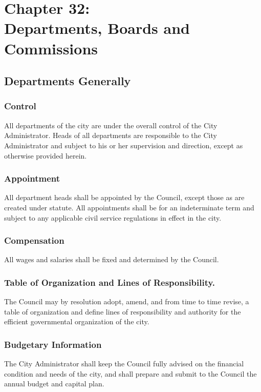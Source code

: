 \chapter*{Chapter 32: \\
	Departments, Boards and Commissions}
    \vfill
    \minitoc
    \pagebreak

\section{Departments Generally}
\subsection{Control}
All departments of the city are under the overall control of the City Administrator. Heads of all departments are responsible to the City Administrator and subject to his or her supervision and direction, except as otherwise provided herein.
\subsection{Appointment}
All department heads shall be appointed by the Council, except those as are created under statute. All appointments shall be for an indeterminate term and subject to any applicable civil service regulations in effect in the city.
\subsection{Compensation}
All wages and salaries shall be fixed and determined by the Council.
\subsection{Table of Organization and Lines of Responsibility.}
The Council may by resolution adopt, amend, and from time to time revise, a table of organization and define lines of responsibility and authority for the efficient governmental organization of the city.
\subsection{Budgetary Information}
The City Administrator shall keep the Council fully advised on the financial condition and needs of the city, and shall prepare and submit to the Council the annual budget and capital plan.

